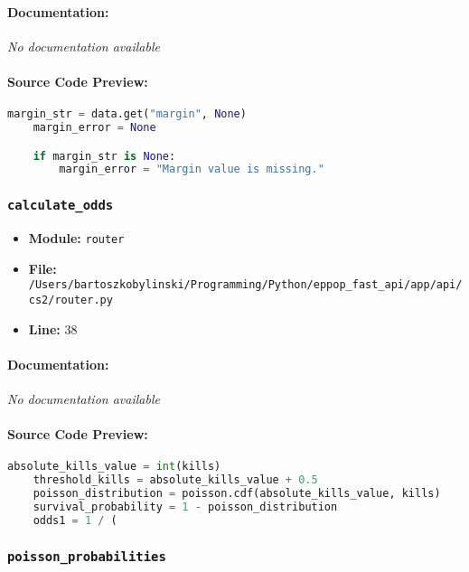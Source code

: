 \documentclass[11pt,a4paper]{article}
\begin{document}
\paragraph{Documentation:} \textit{No documentation available}

\paragraph{Source Code Preview:}
\begin{lstlisting}[language=Python]
    margin_str = data.get("margin", None)
    margin_error = None

    if margin_str is None:
        margin_error = "Margin value is missing."
\end{lstlisting}

\vspace{1em}
\subsubsection{\texttt{calculate\_odds}}

\begin{itemize}
    \item \textbf{Module:} \texttt{router}
    \item \textbf{File:} \texttt{/Users/bartoszkobylinski/Programming/Python/eppop\_fast\_api/app/api/cs2/router.py}
    \item \textbf{Line:} 38
\end{itemize}

\paragraph{Documentation:} \textit{No documentation available}

\paragraph{Source Code Preview:}
\begin{lstlisting}[language=Python]
    absolute_kills_value = int(kills)
    threshold_kills = absolute_kills_value + 0.5
    poisson_distribution = poisson.cdf(absolute_kills_value, kills)
    survival_probability = 1 - poisson_distribution
    odds1 = 1 / (
\end{lstlisting}

\vspace{1em}
\subsubsection{\texttt{poisson\_probabilities}}
\end{document}
